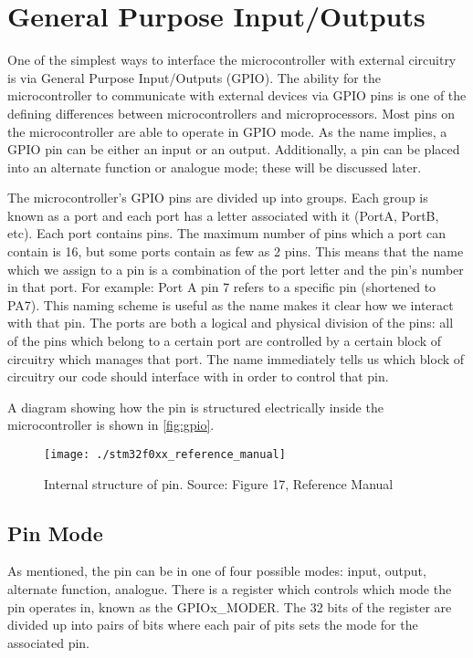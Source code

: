\chapter{General Purpose Input/Outputs}

One of the simplest ways to interface the microcontroller with external circuitry is via General Purpose Input/Outputs (GPIO). The ability for the microcontroller to communicate with external devices via GPIO pins is one of the defining differences between microcontrollers and microprocessors.
Most pins on the microcontroller are able to operate in GPIO mode. As the name implies, a GPIO pin can be either an input or an output. Additionally, a pin can be placed into an alternate function or analogue mode; these will be discussed later.

The microcontroller's GPIO pins are divided up into groups. Each group is known as a port and each port has a letter associated with it (PortA, PortB, etc). Each port contains pins. The maximum number of pins which a port can contain is 16, but some ports contain as few as 2 pins. This means that the name which we assign to a pin is a combination of the port letter and the pin's number in that port. For example: Port A pin 7 refers to a specific pin (shortened to PA7). This naming scheme is useful as the name makes it clear how we interact with that pin. The ports are both a logical and physical division of the pins: all of the pins which belong to a certain port are controlled by a certain block of circuitry which manages that port. The name immediately tells us which block of circuitry our code should interface with in order to control that pin.

A diagram showing how the pin is structured electrically inside the microcontroller is shown in \autoref{fig:gpio}. 
\begin{figure}
\centering
\texttt{[image: ./stm32f0xx\_reference\_manual]}
\caption{Internal structure of pin. Source: Figure 17, Reference Manual}
\label{fig:gpio}
\end{figure}


\section{Pin Mode}
As mentioned, the pin can be in one of four possible modes: input, output, alternate function, analogue. There is a register which controls which mode the pin operates in, known as the GPIOx\_MODER. The 32 bits of the register are divided up into pairs of bits where each pair of pits sets the mode for the associated pin. 

